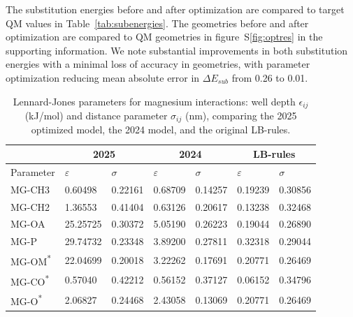 \documentclass[journal=langd5,manuscript=article]{achemso}
\begin{document}
The substitution energies before and after optimization are compared to target QM values in Table~\ref{tab:subenergies}. The geometries before and after optimization are compared to QM geometries in figure~S\ref{fig:optres} in the
supporting information. We note substantial improvements in both substitution energies with a minimal loss of accuracy in geometries, 
with parameter optimization reducing mean absolute error in $\Delta E_{sub}$ from 0.26 to 0.01. %

\begin{table}[h!]
\centering
\begin{tabularx}{\textwidth}{|X|X|X|X|X|X|X|}
\hline
                         & \multicolumn{2}{c|}{\textbf{2025}} & \multicolumn{2}{c|}{\textbf{2024}} & \multicolumn{2}{c|}{\textbf{LB-rules}} \\\hline
Parameter                & \boldmath$\varepsilon$             & \boldmath$\sigma$                  & \boldmath$\varepsilon$                          & \boldmath$\sigma$ & \boldmath$\varepsilon$ & \boldmath$\sigma$ \\\hline
MG-CH3                   & 0.60498                            & 0.22161                            & 0.68709                                         & 0.14257           & 0.19239                & 0.30856 \\\hline
MG-CH2                   & 1.36553                            & 0.41404                            & 0.63126                                         & 0.20617           & 0.13238                & 0.32468 \\\hline
MG-OA                    & 25.25725                           & 0.30372                            & 5.05190                                         & 0.26223           & 0.19044                & 0.26890 \\\hline
MG-P                     & 29.74732                           & 0.23348                            & 3.89200                                         & 0.27811           & 0.32318                & 0.29044 \\\hline
MG-OM\textsuperscript{*} & 22.04699                           & 0.20018                            & 3.22262                                         & 0.17691           & 0.20771                & 0.26469 \\\hline
MG-CO\textsuperscript{*} & 0.57040                            & 0.42212                            & 0.56152                                         & 0.37127           & 0.06152                & 0.34796 \\\hline
MG-O\textsuperscript{*}  & 2.06827                            & 0.24468                            & 2.43058                                         & 0.13069           & 0.20771                & 0.26469 \\\hline
\end{tabularx}
\caption{Lennard-Jones parameters for magnesium interactions: well depth $\epsilon_{ij}$ (kJ/mol) and distance parameter $\sigma_{ij}$ (nm), comparing the 2025 optimized model, the 2024 model, and the original LB-rules.}
\label{tab:params}
\end{table}
\end{document}
